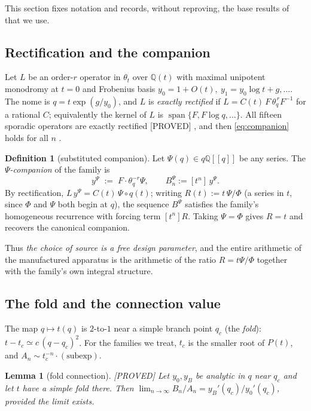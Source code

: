 \documentclass[11pt,reqno]{amsart}
\theoremstyle{plain}
\newtheorem{lemma}[theorem]{Lemma}
\theoremstyle{definition}
\newtheorem{definition}[theorem]{Definition}
\theoremstyle{remark}
\newcommand{\Q}{\mathbb{Q}}
\newcommand{\thq}{\theta_q}
\newcommand{\tht}{\theta_t}
\newcommand{\Proved}{\textup{\textsf{[PROVED]}}}
\begin{document}
This section fixes notation and records, without reproving, the base
results of \cite{anchors,philedger} that we use.

\subsection{Rectification and the companion}
Let $L$ be an order-$r$ operator in $\tht$ over $\Q(t)$ with maximal
unipotent monodromy at $t=0$ and Frobenius basis $y_0=1+O(t),\ y_1=y_0\log
t+g,\dots$. The nome is $q=t\exp(g/y_0)$, and $L$ is \emph{exactly
rectified} if $L=C(t)\,F\,\thq^{\,r}F^{-1}$ for a rational $C$; equivalently
the kernel of $L$ is $\operatorname{span}\{F,F\log q,\dots\}$. All fifteen
sporadic operators are exactly rectified \Proved{}
\cite[Thm.~3.6,~Cor.~3.7]{anchors}, and then \eqref{eq:companion} holds for
all $n$ \cite[Thm.~3.8]{anchors}.

\begin{definition}[substituted companion]\label{def:sub}
Let $\Psi(q)\in q\Q[[q]]$ be any series. The \emph{$\Psi$-companion} of the
family is
\[
y^\Psi\;:=\;F\cdot\thq^{-r}\Psi ,\qquad B^\Psi_n:=[t^n]\,y^\Psi .
\]
By rectification, $L\,y^\Psi=C(t)\,\Psi\!\circ\!q(t)$; writing
$R(t):=t\,\Psi/\Phi$ (a series in $t$, since $\Phi$ and $\Psi$ both begin
at $q$), the sequence $B^\Psi$ satisfies the family's homogeneous
recurrence with forcing term $[t^{n}]R$. Taking $\Psi=\Phi$ gives
$R=t$ and recovers the canonical companion.
\end{definition}

Thus \emph{the choice of source is a free design parameter}, and the entire
arithmetic of the manufactured apparatus is the arithmetic of the ratio
$R=t\Psi/\Phi$ together with the family's own integral structure.

\subsection{The fold and the connection value}
The map $q\mapsto t(q)$ is $2$-to-$1$ near a simple branch point $q_c$ (the
\emph{fold}): $t-t_c\simeq c\,(q-q_c)^2$. For the families we treat, $t_c$
is the smaller root of $P(t)$, and $A_n\sim t_c^{-n}\cdot(\text{subexp})$.

\begin{lemma}[fold connection]\label{lem:fold}
\Proved{} Let $y_0,y_B$ be analytic in $q$ near $q_c$ and let $t$ have a
simple fold there. Then
$\lim_{n\to\infty}B_n/A_n=y_B'(q_c)/y_0'(q_c)$, provided the limit exists.
\end{lemma}
\end{document}
